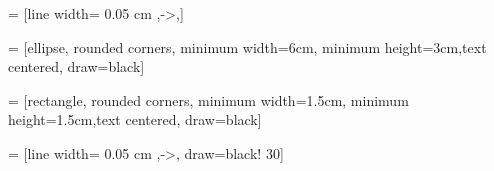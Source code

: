  = [line width= 0.05 cm ,->,]



 = [ellipse, rounded corners, minimum width=6cm, minimum height=3cm,text centered, draw=black]

 = [rectangle, rounded corners, minimum width=1.5cm, minimum height=1.5cm,text centered, draw=black]

 = [line width= 0.05 cm ,->, draw=black! 30]



\def\checkmark{\tikz\fill[scale=0.4](0,.35) -- (.25,0) -- (1,.7) -- (.25,.15) -- cycle;} 



\renewcommand{\lsImpressumExtra}{This book is the revised version of the author's PhD dissertation Heinrich-Heine-Universität Düsseldorf, 2018 (D61)}


\renewcommand{\textlengthmark}{ː}